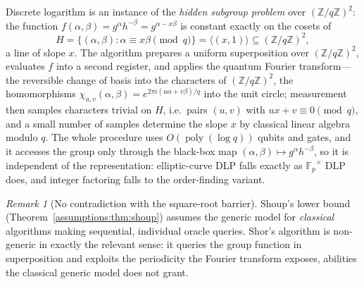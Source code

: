 \documentclass[11pt,a4paper]{article}
\theoremstyle{definition}
\theoremstyle{remark}
\newtheorem{remark}[theorem]{Remark}
\newcommand{\Z}{\ensuremath{\mathbb{Z}}}
\newcommand{\Fp}{\ensuremath{\mathbb{F}_{p}}}
\DeclareMathOperator{\poly}{poly}
\begin{document}
Discrete logarithm is an instance of the \emph{hidden subgroup problem}
over \((\Z/q\Z)^{2}\): the function
\(f(\alpha, \beta) = g^{\alpha} h^{-\beta} = g^{\alpha - x\beta}\)
is constant exactly on the cosets of
\[
H = \bigl\{ (\alpha, \beta) : \alpha \equiv x\beta \pmod q \bigr\}
  = \langle (x, 1) \rangle \subseteq (\Z/q\Z)^{2},
\]
a line of slope \(x\). The algorithm prepares a uniform superposition
over \((\Z/q\Z)^{2}\), evaluates \(f\) into a second register, and
applies the quantum Fourier transform---the reversible change of
basis into the characters of \((\Z/q\Z)^{2}\), the homomorphisms
\(\chi_{u,v}(\alpha, \beta) = e^{2\pi i (u\alpha + v\beta)/q}\) into
the unit circle; measurement then samples characters trivial on
\(H\), i.e.\ pairs \((u, v)\) with \(u x + v \equiv 0 \pmod q\), and
a small number of samples determine the slope \(x\) by classical
linear algebra modulo \(q\). The
whole procedure uses \(O(\poly(\log q))\) qubits and gates, and it
accesses the group only through the black-box map
\((\alpha, \beta) \mapsto g^{\alpha} h^{-\beta}\), so it is
independent of the representation: elliptic-curve DLP falls exactly as
\(\Fp^{\times}\) DLP does, and integer factoring falls to the
order-finding variant.

\begin{remark}[No contradiction with the square-root barrier]
\label{assumptions:rem:no-contradiction}
Shoup's lower bound (Theorem~\ref{assumptions:thm:shoup}) assumes the
generic model for \emph{classical} algorithms making sequential,
individual oracle queries. Shor's algorithm is non-generic in exactly
the relevant sense: it queries the group function in superposition
and exploits the periodicity the Fourier transform exposes, abilities
the classical generic model does not grant.
\end{remark}
\end{document}
